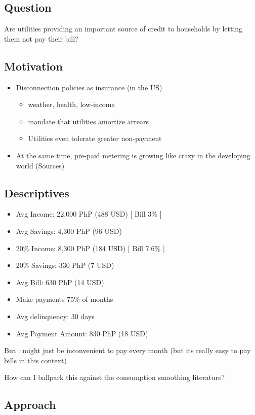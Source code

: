 \documentclass[12pt]{article}
\begin{document}
\subsection{Question} 
Are utilities providing an important source of credit to households by letting them not pay their bill?

\subsection{Motivation}
\begin{itemize}
\item Disconnection policies as insurance (in the US) 
	\begin{itemize}
		\item weather, health, low-income
		\item mandate that utilities amortize arrears
		\item Utilities even tolerate greater non-payment
	\end{itemize}
\item At the same time, pre-paid metering is growing like crazy in the developing world (Sources)
\end{itemize}

\subsection{Descriptives}
\begin{itemize}
\item Avg Income: 22,000 PhP (488 USD)   [ Bill 3\% ]
\item Avg Savings: 4,300 PhP (96 USD) 
\item 20\% Income: 8,300 PhP (184 USD)  [ Bill 7.6\% ]
\item 20\% Savings: 330 PhP (7 USD)  
\item Avg Bill: 630 PhP (14 USD)
\item Make payments 75\% of months
\item Avg delinquency: 30 days
\item Avg Payment Amount: 830 PhP (18 USD)
\end{itemize}

But : might just be inconvenient to pay every month (but its really easy to pay bills in this context)

How can I ballpark this against the consumption smoothing literature?

\subsection{Approach}
\end{document}
